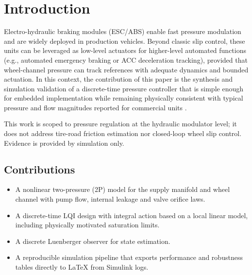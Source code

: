 \documentclass[a4paper]{ifacconf}
\begin{document}
\section{Introduction}
Electro-hydraulic braking modules (ESC/ABS) enable fast pressure modulation and are widely deployed in production vehicles. Beyond classic slip control, these units can be leveraged as low-level actuators for higher-level automated functions (e.g., automated emergency braking or ACC deceleration tracking), provided that wheel-channel pressure can track references with adequate dynamics and bounded actuation. In this context, the contribution of this paper is the synthesis and simulation validation of a discrete-time pressure controller that is simple enough for embedded implementation while remaining physically consistent with typical pressure and flow magnitudes reported for commercial units \citep{Konrad2014,Rudolf2011,ZengYangHuang2023,HouhuaJing2022}.

This work is scoped to pressure regulation at the hydraulic modulator level; it does not address tire-road friction estimation nor closed-loop wheel slip control. Evidence is provided by simulation only.

\subsection{Contributions}
\begin{itemize}
    \item A nonlinear two-pressure (2P) model for the supply manifold and wheel channel with pump flow, internal leakage and valve orifice laws.
    \item A discrete-time LQI design with integral action based on a local linear model, including physically motivated saturation limits.
    \item A discrete Luenberger observer for state estimation.
    \item A reproducible simulation pipeline that exports performance and robustness tables directly to LaTeX from Simulink logs.
\end{itemize}
\end{document}
